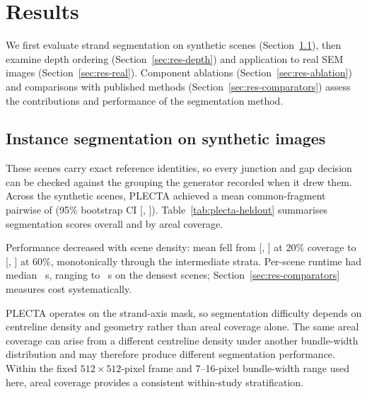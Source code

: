 \section{Results}
\label{sec:results}

We first evaluate strand segmentation on synthetic scenes
(Section~\ref{sec:res-density}), then examine depth ordering
(Section~\ref{sec:res-depth}) and application to real SEM images
(Section~\ref{sec:res-real}). Component ablations
(Section~\ref{sec:res-ablation}) and comparisons with published methods
(Section~\ref{sec:res-comparators}) assess the contributions and performance
of the segmentation method.

\subsection{Instance segmentation on synthetic images}
\label{sec:res-density}

These scenes carry exact reference identities, so every junction and gap
decision can be checked against the grouping the generator recorded when it
drew them.
Across the \PlectaHeldoutSceneCount{} synthetic scenes, PLECTA
achieved a mean common-fragment pairwise \Fone{} of
\PlectaHeldoutFOneMean{} (95\% bootstrap CI
[\PlectaHeldoutFOneCILow{}, \PlectaHeldoutFOneCIHigh{}]).
Table~\ref{tab:plecta-heldout} summarises segmentation scores overall and by
areal coverage.

\begin{table}[tbp]
    \centering
    \caption{Segmentation scores overall and by target areal
    coverage. VI denotes variation of information, for which lower is better;
    higher is better for the other metrics.}
    \label{tab:plecta-heldout}
\setlength{\tabcolsep}{3pt}
    
\end{table}

Performance decreased with scene density: mean \Fone{} fell from
\PlectaDensityTwoZeroFOneMean{}
[\PlectaDensityTwoZeroFOneCILow{}, \PlectaDensityTwoZeroFOneCIHigh{}] at 20\%
coverage to \PlectaDensitySixZeroFOneMean{}
[\PlectaDensitySixZeroFOneCILow{}, \PlectaDensitySixZeroFOneCIHigh{}] at 60\%,
monotonically through the intermediate strata.
Per-scene runtime had median \PlectaHeldoutRuntimeMedian{}~s, ranging to
\PlectaHeldoutRuntimeMaximum{}~s on the densest scenes;
Section~\ref{sec:res-comparators} measures cost systematically.

PLECTA operates on the strand-axis mask, so segmentation difficulty depends
on centreline density and geometry rather than areal coverage alone. The same
areal coverage can arise from a different centreline density under another
bundle-width distribution and may therefore produce different segmentation
performance. Within the fixed $512\times512$-pixel frame and 7--16-pixel
bundle-width range used here, areal coverage provides a consistent within-study
stratification.

